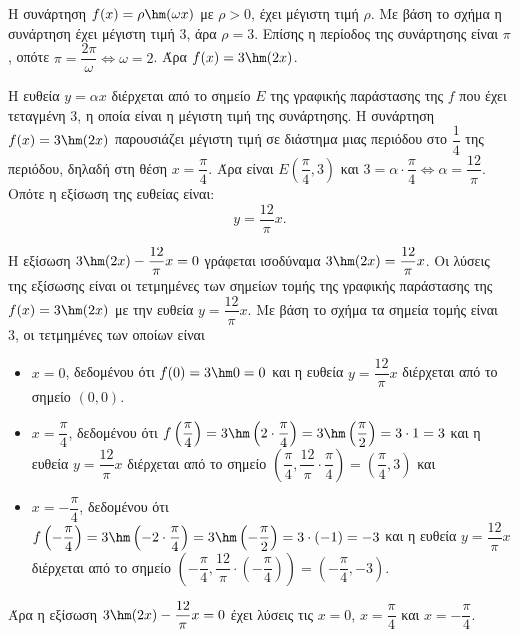 \begin{alist}
\item Η συνάρτηση $f(x) = \rho\hm (\omega x)$ με $\rho > 0$, έχει μέγιστη τιμή $\rho$. Με βάση το σχήμα η συνάρτηση έχει μέγιστη τιμή 3, άρα $\rho = 3$. Επίσης η περίοδος της συνάρτησης είναι $\pi$, οπότε $\pi = \dfrac{2\pi}{\omega} \Leftrightarrow \omega = 2$. Άρα $f(x) = 3\hm (2x)$.
\item Η ευθεία $y = \alpha x$ διέρχεται από το σημείο $E$ της γραφικής παράστασης της $f$ που έχει τεταγμένη 3, η οποία είναι η μέγιστη τιμή της συνάρτησης. Η συνάρτηση $f(x) = 3\hm (2x)$ παρουσιάζει μέγιστη τιμή σε διάστημα μιας περιόδου στο $\dfrac{1}{4}$ της περιόδου, δηλαδή στη θέση $x = \dfrac{\pi}{4}$. Άρα είναι $E\left(\dfrac{\pi}{4}, 3\right)$ και $3 = \alpha \cdot \dfrac{\pi}{4} \Leftrightarrow \alpha = \dfrac{12}{\pi}$. Οπότε η εξίσωση της ευθείας είναι:
\[y = \frac{12}{\pi}x.\]
\item Η εξίσωση $3\hm (2x) - \dfrac{12}{\pi}x = 0$ γράφεται ισοδύναμα $3\hm (2x) = \dfrac{12}{\pi}x$. Οι λύσεις της εξίσωσης είναι οι τετμημένες των σημείων τομής της γραφικής παράστασης της $f(x) = 3\hm (2x)$ με την ευθεία $y = \dfrac{12}{\pi}x$. Με βάση το σχήμα τα σημεία τομής είναι 3, οι τετμημένες των οποίων είναι
\begin{itemize}
    \item $x = 0$, δεδομένου ότι $f(0) = 3\hm  0 = 0$ και η ευθεία $y = \dfrac{12}{\pi}x$ διέρχεται από το σημείο $(0,0)$.
    \item $x = \dfrac{\pi}{4}$, δεδομένου ότι $f\left(\dfrac{\pi}{4}\right) = 3\hm \left(2 \cdot \dfrac{\pi}{4}\right) = 3\hm \left(\dfrac{\pi}{2}\right) = 3 \cdot 1 = 3$ και η ευθεία $y = \dfrac{12}{\pi}x$ διέρχεται από το σημείο $\left(\dfrac{\pi}{4}, \dfrac{12}{\pi} \cdot \dfrac{\pi}{4}\right) = \left(\dfrac{\pi}{4}, 3\right)$ και
    \item $x = -\dfrac{\pi}{4}$, δεδομένου ότι $f\left(-\dfrac{\pi}{4}\right) = 3\hm \left(-2 \cdot \dfrac{\pi}{4}\right) = 3\hm \left(-\dfrac{\pi}{2}\right) = 3 \cdot (-1) = -3$ και η ευθεία $y = \dfrac{12}{\pi}x$ διέρχεται από το σημείο $\left(-\dfrac{\pi}{4}, \dfrac{12}{\pi} \cdot \left(-\dfrac{\pi}{4}\right)\right) = \left(-\dfrac{\pi}{4}, -3\right)$.
\end{itemize}
Άρα η εξίσωση $3\hm (2x) - \dfrac{12}{\pi}x = 0$ έχει λύσεις τις $x = 0$, $x = \dfrac{\pi}{4}$ και $x = -\dfrac{\pi}{4}$.
\end{alist}

